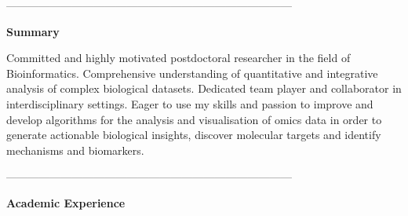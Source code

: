 \documentclass{scrartcl}
\newcommand{\MarginText}[1]{\marginpar{\raggedleft\itshape\small#1}} %
\newcommand{\Description}[1]{\hangindent=2em\hangafter=0\noindent\raggedright\footnotesize{#1}\par\normalsize\vspace{1em}} %
\begin{document}
\begin{cv}{}

\vspace{1em}
\vspace{1em}
------------------------------------------------------------------------------
\begin{flushleft}\textbf{Summary}\end{flushleft}
\begin{center}
 \noindent\makebox[\linewidth]{\rule{173mm}{0.8pt}}
\end{center}
Committed and highly motivated postdoctoral researcher in the field of Bioinformatics. Comprehensive understanding of quantitative and integrative analysis of complex biological datasets. Dedicated team player and collaborator in interdisciplinary settings. Eager to use my skills and passion to improve and develop algorithms for the analysis and visualisation of omics data in order to generate actionable biological insights, discover molecular targets and identify mechanisms and biomarkers.

\vspace{1em}
\vspace{1em}
\vspace{1em}
\vspace{1em}
\vspace{1em}
\vspace{1em}


------------------------------------------------------------------------------

\begin{flushleft}\textbf{Academic Experience}\end{flushleft}
\begin{center}
 \noindent\makebox[\linewidth]{\rule{173mm}{0.8pt}}
\end{center}



\end{cv}
\end{document}
